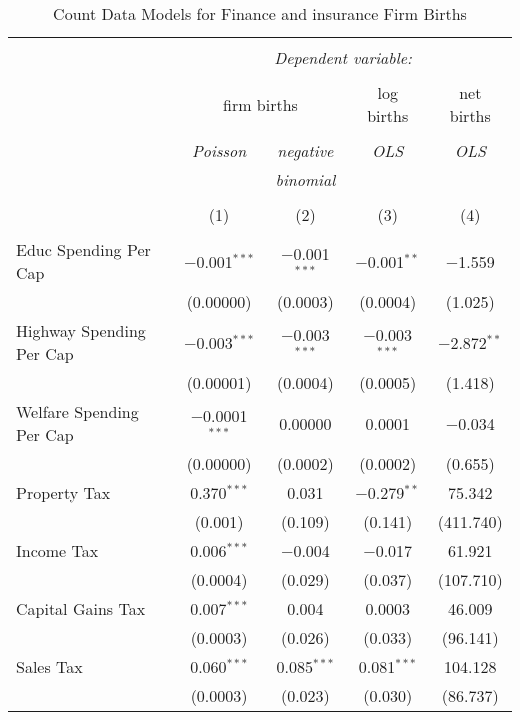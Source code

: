 
\begin{table}[!htbp] \centering 
  \caption{Count Data Models for Finance and insurance Firm Births} 
  \label{} 
\begin{tabular}{@{\extracolsep{5pt}}lcccc} 
\\[-1.8ex]\hline 
\hline \\[-1.8ex] 
 & \multicolumn{4}{c}{\textit{Dependent variable:}} \\ 
\cline{2-5} 
\\[-1.8ex] & \multicolumn{2}{c}{firm births} & log births & net births \\ 
\\[-1.8ex] & \textit{Poisson} & \textit{negative} & \textit{OLS} & \textit{OLS} \\ 
 & \textit{} & \textit{binomial} & \textit{} & \textit{} \\ 
\\[-1.8ex] & (1) & (2) & (3) & (4)\\ 
\hline \\[-1.8ex] 
 Educ Spending Per Cap & $-$0.001$^{***}$ & $-$0.001$^{***}$ & $-$0.001$^{**}$ & $-$1.559 \\ 
  & (0.00000) & (0.0003) & (0.0004) & (1.025) \\ 
  Highway Spending Per Cap  & $-$0.003$^{***}$ & $-$0.003$^{***}$ & $-$0.003$^{***}$ & $-$2.872$^{**}$ \\ 
  & (0.00001) & (0.0004) & (0.0005) & (1.418) \\ 
  Welfare Spending Per Cap  & $-$0.0001$^{***}$ & 0.00000 & 0.0001 & $-$0.034 \\ 
  & (0.00000) & (0.0002) & (0.0002) & (0.655) \\ 
  Property Tax & 0.370$^{***}$ & 0.031 & $-$0.279$^{**}$ & 75.342 \\ 
  & (0.001) & (0.109) & (0.141) & (411.740) \\ 
  Income Tax & 0.006$^{***}$ & $-$0.004 & $-$0.017 & 61.921 \\ 
  & (0.0004) & (0.029) & (0.037) & (107.710) \\ 
  Capital Gains Tax & 0.007$^{***}$ & 0.004 & 0.0003 & 46.009 \\ 
  & (0.0003) & (0.026) & (0.033) & (96.141) \\ 
  Sales Tax & 0.060$^{***}$ & 0.085$^{***}$ & 0.081$^{***}$ & 104.128 \\ 
  & (0.0003) & (0.023) & (0.030) & (86.737) \\ 

\end{tabular}
\end{table}
